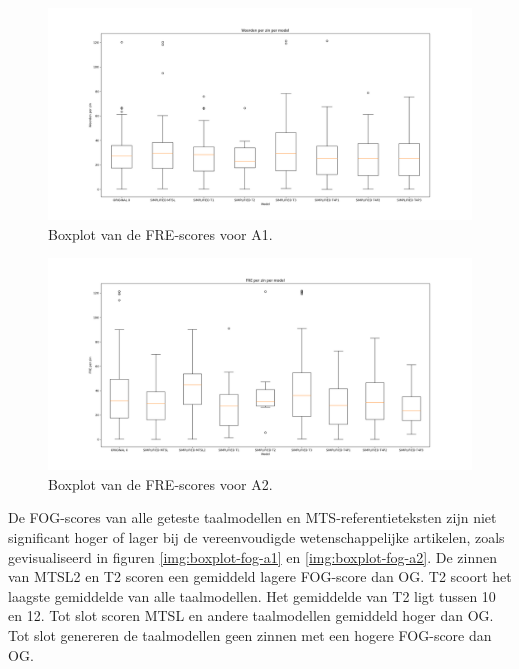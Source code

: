 \begin{figure}[H]
	\includegraphics[width=\linewidth]{img/boxplot-fre-a1.png}
	\caption{Boxplot van de FRE-scores voor A1.}
	\label{img:boxplot-fre-a1}
\end{figure}

\begin{figure}[H]
	\includegraphics[width=\linewidth]{img/boxplot-fre-a2.png}
	\caption{Boxplot van de FRE-scores voor A2.}
	\label{img:boxplot-fre-a2}
\end{figure}

De FOG-scores van alle geteste taalmodellen en MTS-referentieteksten zijn niet significant hoger of lager bij de vereenvoudigde wetenschappelijke artikelen, zoals gevisualiseerd in figuren \ref{img:boxplot-fog-a1} en \ref{img:boxplot-fog-a2}. De zinnen van MTSL2 en T2 scoren een gemiddeld lagere FOG-score dan OG. T2 scoort het laagste gemiddelde van alle taalmodellen. Het gemiddelde van T2 ligt tussen 10 en 12. Tot slot scoren MTSL en andere taalmodellen gemiddeld hoger dan OG. Tot slot genereren de taalmodellen geen zinnen met een hogere FOG-score dan OG.

